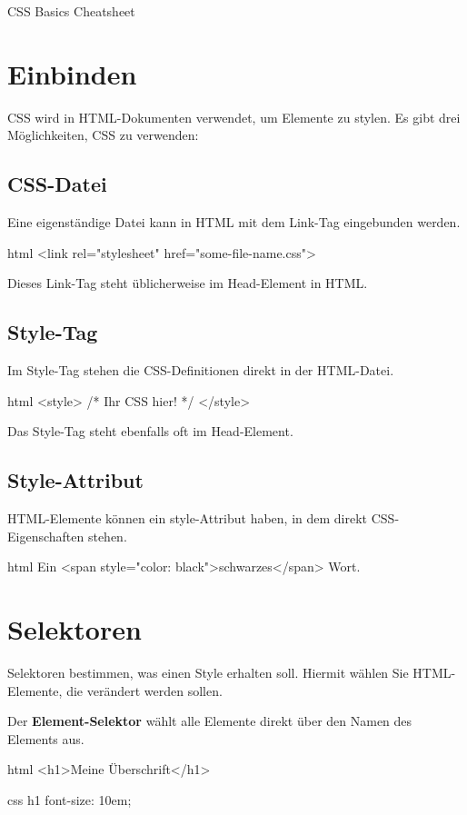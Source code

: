 \documentclass[10pt,a4paper]{article}
\begin{document}
{\color{accentcolor}CSS Basics Cheatsheet}

\begin{multicols}{3}

\scriptsize

\section*{Einbinden}
CSS wird in HTML-Dokumenten verwendet, um Elemente zu stylen. Es gibt drei Möglichkeiten, CSS zu verwenden:

\subsection*{CSS-Datei}
Eine eigenständige Datei kann in HTML mit dem Link-Tag eingebunden werden.
\begin{codebox}{html}{}
<link rel="stylesheet" href="some-file-name.css">
\end{codebox}
Dieses Link-Tag steht üblicherweise im Head-Element in HTML.

\subsection*{Style-Tag}
Im Style-Tag stehen die CSS-Definitionen direkt in der HTML-Datei.
\begin{codebox}{html}{}
<style>
/* Ihr CSS hier! */
</style>
\end{codebox}
Das Style-Tag steht ebenfalls oft im Head-Element.

\subsection*{Style-Attribut}
HTML-Elemente können ein style-Attribut haben, in dem direkt CSS-Eigenschaften stehen.
\begin{codebox}{html}{}
Ein <span style="color: black">schwarzes</span> Wort.
\end{codebox}

\section*{Selektoren}
Selektoren bestimmen, was einen Style erhalten soll. Hiermit wählen Sie HTML-Elemente, die verändert werden sollen.
\vspace{0.2cm}

Der \textbf{Element-Selektor} wählt alle Elemente direkt über den Namen des Elements aus.
\begin{codebox}{html}{}
<h1>Meine Überschrift</h1>
\end{codebox}
\begin{codebox}{css}{}
h1 {
  font-size: 10em;
}
\end{codebox}


\end{multicols}
\end{document}
